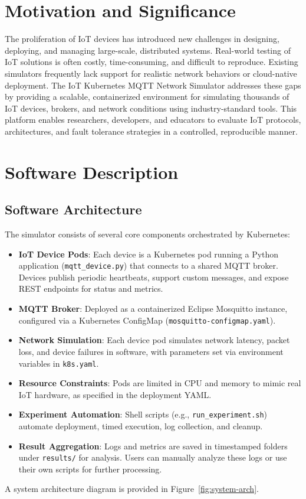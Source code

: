 \documentclass[review]{elsarticle}
\begin{document}
\maketitle

\section{Motivation and Significance}
The proliferation of IoT devices has introduced new challenges in designing, deploying, and managing large-scale, distributed systems. Real-world testing of IoT solutions is often costly, time-consuming, and difficult to reproduce. Existing simulators frequently lack support for realistic network behaviors or cloud-native deployment. The IoT Kubernetes MQTT Network Simulator addresses these gaps by providing a scalable, containerized environment for simulating thousands of IoT devices, brokers, and network conditions using industry-standard tools. This platform enables researchers, developers, and educators to evaluate IoT protocols, architectures, and fault tolerance strategies in a controlled, reproducible manner.

\section{Software Description}
\subsection{Software Architecture}
The simulator consists of several core components orchestrated by Kubernetes:
\begin{itemize}
    \item \textbf{IoT Device Pods}: Each device is a Kubernetes pod running a Python application (\texttt{mqtt\_device.py}) that connects to a shared MQTT broker. Devices publish periodic heartbeats, support custom messages, and expose REST endpoints for status and metrics.
    \item \textbf{MQTT Broker}: Deployed as a containerized Eclipse Mosquitto instance, configured via a Kubernetes ConfigMap (\texttt{mosquitto-configmap.yaml}).
    \item \textbf{Network Simulation}: Each device pod simulates network latency, packet loss, and device failures in software, with parameters set via environment variables in \texttt{k8s.yaml}.
    \item \textbf{Resource Constraints}: Pods are limited in CPU and memory to mimic real IoT hardware, as specified in the deployment YAML.
    \item \textbf{Experiment Automation}: Shell scripts (e.g., \texttt{run\_experiment.sh}) automate deployment, timed execution, log collection, and cleanup.
    \item \textbf{Result Aggregation}: Logs and metrics are saved in timestamped folders under \texttt{results/} for analysis. Users can manually analyze these logs or use their own scripts for further processing.
\end{itemize}
A system architecture diagram is provided in Figure~\ref{fig:system-arch}.
\end{document}
